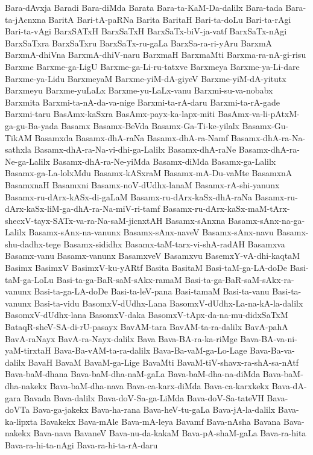 {Bara-dAvxja
Baradi
Bara-diMda
Barata
Bara-ta-KaM-Da-dalilx
Bara-tada
Bara-ta-jAcnxna
BaritA
Bari-tA-paRNa
Barita
BaritaH
Bari-ta-doLu
Bari-ta-rAgi
Bari-ta-vAgi
BarxSATxH
BarxSaTxH
BarxSaTx-biV-ja-vatf
BarxSaTx-nAgi
BarxSaTxra
BarxSaTxru
BarxSaTx-ru-gaLa
BarxSa-ra-ri-yAru
BarxmA
BarxmA-dhiVna
BarxmA-dhiV-naru
BarxmaH
BarxmaMti
Barxma-ra-nA-gi-risu
Barxme
Barxme-ga-LigU
Barxme-ga-Li-ru-tatxve
Barxmeya
Barxme-ya-Li-dare
Barxme-ya-Lidu
BarxmeyaM
Barxme-yiM-dA-giyeV
Barxme-yiM-dA-yitutx
Barxmeyu
Barxme-yuLaLx
Barxme-yu-LaLx-vanu
Barxmi-su-va-nobabx
Barxmita
Barxmi-ta-nA-da-va-nige
Barxmi-ta-rA-daru
Barxmi-ta-rA-gade
Barxmi-taru
BasAmx-kaSxra
BasAmx-payx-ka-lapx-miti
BasAmx-va-li-pAtxM-ga-gu-Ba-yada
Basamx
Basamx-BeVda
Basamx-Ga-Ti-ke-yilalx
Basamx-Gu-TikAM
Basamxda
Basamx-dhA-raNa
Basamx-dhA-ra-Namf
Basamx-dhA-ra-Na-sathxla
Basamx-dhA-ra-Na-vi-dhi-ga-Lalilx
Basamx-dhA-raNe
Basamx-dhA-ra-Ne-ga-Lalilx
Basamx-dhA-ra-Ne-yiMda
Basamx-diMda
Basamx-ga-Lalilx
Basamx-ga-La-lolxMdu
Basamx-kASxraM
Basamx-mA-Du-vaMte
BasamxnA
BasamxnaH
Basamxni
Basamx-noV-dUdhx-lanaM
Basamx-rA-shi-yanunx
Basamx-ru-dArx-kASx-di-gaLaM
Basamx-ru-dArx-kaSx-dhA-raNa
Basamx-ru-dArx-kaSx-liM-ga-dhA-ra-Na-miV-ri-tamf
Basamx-ru-dArx-kaSx-maM-tArx-shecxV-tayx-SATx-va-ra-Na-saM-jicnxtAH
Basamx-sAnxna
Basamx-sAnx-na-ga-Lalilx
Basamx-sAnx-na-vanunx
Basamx-sAnx-naveV
Basamx-sAnx-navu
Basamx-shu-dadhx-tege
Basamx-sididhx
Basamx-taM-tarx-vi-shA-radAH
Basamxva
Basamx-vanu
Basamx-vanunx
BasamxveV
Basamxvu
BasemxY-vA-dhi-kaqtaM
Basimx
BasimxV
BasimxV-ku-yARtf
Basita
BasitaM
Basi-taM-ga-LA-doDe
Basi-taM-ga-LoLu
Basi-ta-ga-BaR-saM-sAkx-ramaM
Basi-ta-ga-BaR-saM-sAkx-ra-vanunx
Basi-ta-ga-LA-doDe
Basi-ta-leV-pana
Basi-tamaM
Basi-ta-vanu
Basi-ta-vanunx
Basi-ta-vidu
BasomxV-dUdhx-Lana
BasomxV-dUdhx-La-na-kA-la-dalilx
BasomxV-dUdhx-lana
BasomxV-daka
BasomxV-tApx-da-na-mu-didxSaTxM
BataqR-sheV-SA-di-rU-pasayx
BavAM-tara
BavAM-ta-ra-dalilx
BavA-pahA
BavA-raNayx
BavA-ra-Nayx-dalilx
Bava
Bava-BA-ra-ka-riMge
Bava-BA-va-ni-yaM-tirxtaH
Bava-Ba-vAM-ta-ra-dalilx
Bava-Ba-vaM-ga-Lo-Lage
Bava-Ba-va-dalilx
BavaH
BavaM
BavaM-ga-Lige
BavaMti
BavaM-tiV-shavx-ra-shA-sa-nAtf
Bava-baM-dhana
Bava-baM-dha-naM-gaLa
Bava-baM-dha-na-diMda
Bava-baM-dha-nakekx
Bava-baM-dha-nava
Bava-ca-karx-diMda
Bava-ca-karxkekx
Bava-dA-gara
Bavada
Bava-dalilx
Bava-doV-Sa-ga-LiMda
Bava-doV-Sa-tateVH
Bava-doVTa
Bava-ga-jakekx
Bava-ha-rana
Bava-heV-tu-gaLa
Bava-jA-la-dalilx
Bava-ka-lipxta
Bavakekx
Bava-mAle
Bava-mA-leya
Bavamf
Bava-nAsha
Bavana
Bava-nakekx
Bava-nava
BavaneV
Bava-nu-da-kakaM
Bava-pA-shaM-gaLa
Bava-ra-hita
Bava-ra-hi-ta-nAgi
Bava-ra-hi-ta-rA-daru
}
